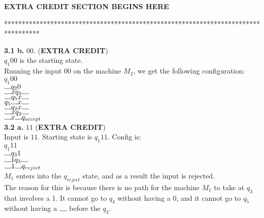 \documentclass[12pt]{article}
\newcommand\Vtextvisiblespace[1][.8em]{%
	\mbox{\kern.07em\vrule height.3ex}%
	\vbox{\hrule width#1}%
	\hbox{\vrule height.3ex}}
\newcommand\tab[1][1cm]{\hspace*{#1}}
\begin{document}
\tab\tab\tab \textbf{EXTRA CREDIT SECTION BEGINS HERE}

**********************************************************************************

\textbf{3.1 b.} 00. (\textbf{EXTRA CREDIT}) \\

$q_1 00$ is the starting state. \\
Running the input 00 on the machine $M_2$, we get the following configuration: \\

$                            q_1 00$ \\
$ \Vtextvisiblespace         q_2  0$ \\
$ \Vtextvisiblespace x       q_3  \Vtextvisiblespace $ \\
$ \Vtextvisiblespace         q_5  x  \Vtextvisiblespace$ \\
$                            q_5 \Vtextvisiblespace x  \Vtextvisiblespace$ \\
$ \Vtextvisiblespace         q_2  x  \Vtextvisiblespace$ \\
$ \Vtextvisiblespace x       q_2 \Vtextvisiblespace $ \\
$ \Vtextvisiblespace x  \Vtextvisiblespace q_{accept} $ \\

\textbf{3.2 a.} $11$ (\textbf{EXTRA CREDIT}) \\

Input is $11$. Starting state is $q_1 11$. Config is: \\

$      q_1 11$ \\
$ \Vtextvisiblespace q_3 1 $ \\
$ \Vtextvisiblespace 1 q_3 \Vtextvisiblespace $ \\
$ \Vtextvisiblespace 1 \Vtextvisiblespace q_{reject} $ \\
$M_1$ enters into the $q_{reject}$ state, and as a result the input is rejected. \\

The reason for this is because there is no path for the machine $M_1$ to take at
$q_3$ that involves a 1. It cannot go to $q_4$ without having a 0, and it cannot
go to $q_5$ without having a $\Vtextvisiblespace$ before the $q_3$. \\
\end{document}
